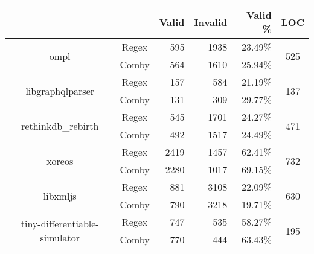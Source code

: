 \documentclass[sigconf,review, anonymous]{acmart}
\begin{document}
{\begin{table}[hbtp]
{\begin{tabular}{|c|c|c|r|r|r|c|}
\hline
 & \multicolumn{2}{c|}{} & \textbf{Valid} & \textbf{Invalid} & \textbf{Valid \%} & \textbf{LOC} \\ \hline
\multirow{2}{*}{ompl} & \multicolumn{2}{c|}{Regex} & 595 \hspace{8pt} & 1938 \hspace{8pt} & 23.49\% & \multirow{2}{*}{525} \\\cline{2-6}
    & \multicolumn{2}{c|}{Comby} & 564 \hspace{8pt} & 1610 \hspace{8pt} & 25.94\% &  \\ \hline
\multirow{2}{*}{libgraphqlparser} & \multicolumn{2}{c|}{Regex} & 157 \hspace{8pt} & 584 \hspace{8pt} & 21.19\% & \multirow{2}{*}{137}\\\cline{2-6}
    & \multicolumn{2}{c|}{Comby} & 131 \hspace{8pt} & 309 \hspace{8pt} & 29.77\% & \\ \hline
\multirow{2}{*}{rethinkdb\_rebirth} & \multicolumn{2}{c|}{Regex} & 545 \hspace{8pt} & 1701 \hspace{8pt} & 24.27\% & \multirow{2}{*}{471}\\\cline{2-6}
    & \multicolumn{2}{c|}{Comby} & 492 \hspace{8pt} & 1517 \hspace{8pt} & 24.49\% & \\ \hline
    
\multirow{2}{*}{xoreos} & \multicolumn{2}{c|}{Regex} & 2419 \hspace{8pt} & 1457 \hspace{8pt} & 62.41\% & \multirow{2}{*}{732}\\\cline{2-6}
    & \multicolumn{2}{c|}{Comby} & 2280 \hspace{8pt} & 1017 \hspace{8pt} & 69.15\% & \\ \hline
\multirow{2}{*}{libxmljs} & \multicolumn{2}{c|}{Regex} & 881 \hspace{8pt} & 3108 \hspace{8pt} & 22.09\% & \multirow{2}{*}{630}\\\cline{2-6}
    & \multicolumn{2}{c|}{Comby} & 790 \hspace{8pt} & 3218 \hspace{8pt} & 19.71\% & \\ \hline
\multirow{2}{*}{tiny-differentiable-simulator} & \multicolumn{2}{c|}{Regex} & 747 \hspace{8pt} & 535 \hspace{8pt} & 58.27\% & \multirow{2}{*}{195}\\\cline{2-6}
    & \multicolumn{2}{c|}{Comby} & 770 \hspace{8pt} & 444 \hspace{8pt} & 63.43\% & \\ \hline


\end{tabular}}
\end{table}}
\end{document}
